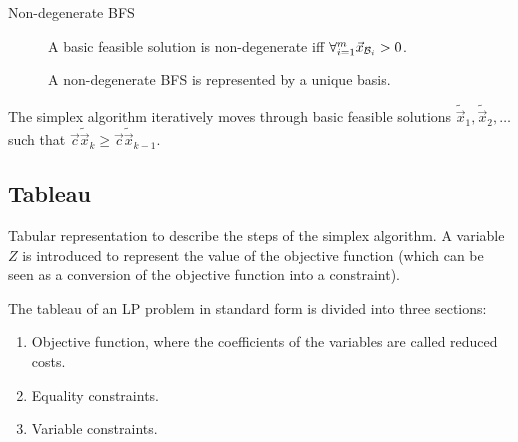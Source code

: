 \begin{description}
        \begin{description}
            \item[Non-degenerate BFS] 
                A basic feasible solution is non-degenerate iff $\forall_{i=1}^m \vec{x}_{\mathcal{B}_i} > 0$.
                \begin{remark}
                    A non-degenerate BFS is represented by a unique basis.
                \end{remark}
        \end{description}

        \begin{remark}
            The simplex algorithm iteratively moves through basic feasible solutions $\tilde{\vec{x}}_1, \tilde{\vec{x}}_2, \dots$
            such that $\vec{c}\tilde{\vec{x}}_k \geq \vec{c}\tilde{\vec{x}}_{k-1}$.
        \end{remark}
\end{description}


\subsection{Tableau}

Tabular representation to describe the steps of the simplex algorithm.
A variable $Z$ is introduced to represent the value of the objective function (which can be seen as a conversion of the objective function into a constraint).

The tableau of an LP problem in standard form is divided into three sections:
\begin{enumerate}
    \item Objective function, where the coefficients of the variables are called reduced costs.
    \item Equality constraints.
    \item Variable constraints.
\end{enumerate}

